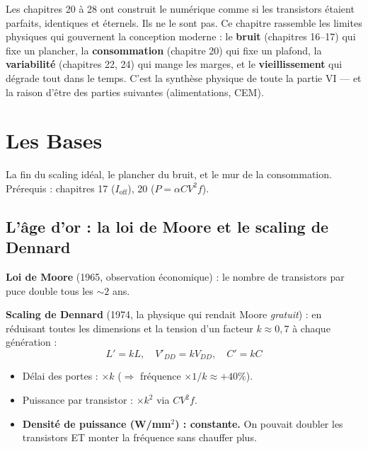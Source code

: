 \documentclass[12pt,a4paper,twoside]{book}
\begin{document}
Les chapitres 20 à 28 ont construit le numérique comme si les transistors étaient parfaits, identiques et éternels. Ils ne le sont pas. Ce chapitre rassemble les limites physiques qui gouvernent la conception moderne : le \textbf{bruit} (chapitres 16--17) qui fixe un plancher, la \textbf{consommation} (chapitre 20) qui fixe un plafond, la \textbf{variabilité} (chapitres 22, 24) qui mange les marges, et le \textbf{vieillissement} qui dégrade tout dans le temps. C'est la synthèse physique de toute la partie VI --- et la raison d'être des parties suivantes (alimentations, CEM).

\section{Les Bases}

\begin{bases}
La fin du scaling idéal, le plancher du bruit, et le mur de la consommation. Prérequis : chapitres 17 ($I_{\text{off}}$), 20 ($P = \alpha C V^2 f$).
\end{bases}

\subsection{L'âge d'or : la loi de Moore et le scaling de Dennard}

\begin{formule}
\textbf{Loi de Moore} (1965, observation économique) : le nombre de transistors par puce double tous les $\sim 2$ ans.

\textbf{Scaling de Dennard} (1974, la physique qui rendait Moore \textit{gratuit}) : en réduisant toutes les dimensions et la tension d'un facteur $k \approx 0{,}7$ à chaque génération :
\[
L' = kL, \quad V'_{DD} = kV_{DD}, \quad C' = kC
\]
\begin{itemize}[nosep]
\item Délai des portes : $\times k$ ($\Rightarrow$ fréquence $\times 1/k \approx +40\%$).
\item Puissance par transistor : $\times k^2$ via $CV^2f$.
\item \textbf{Densité de puissance (W/mm$^2$) : constante.} On pouvait doubler les transistors ET monter la fréquence sans chauffer plus.
\end{itemize}
\end{formule}
\end{document}
